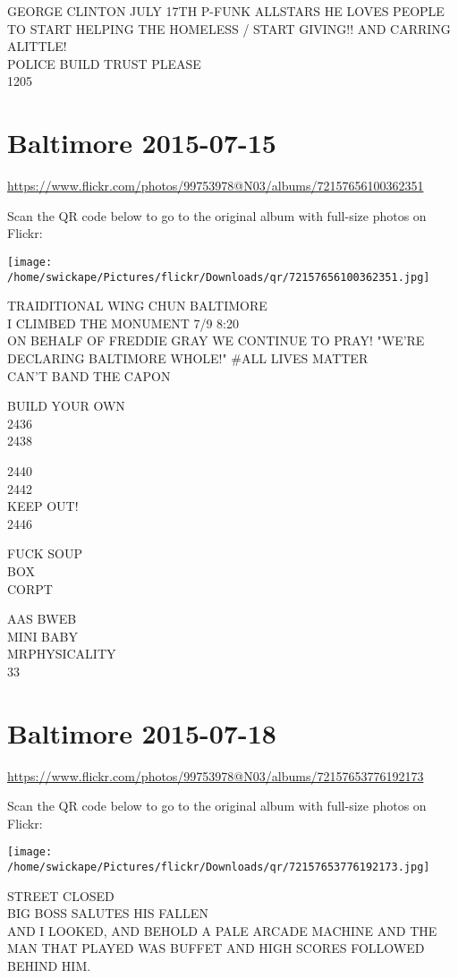 \documentclass[10pt,letterpaper]{article}
\begin{document}
GEORGE CLINTON JULY 17TH P{-}FUNK ALLSTARS HE LOVES PEOPLE TO START HELPING THE HOMELESS / START GIVING!! AND CARRING ALITTLE!\\
POLICE BUILD TRUST PLEASE\\
1205
\pagebreak

\section*{Baltimore 2015-07-15}

\url{https://www.flickr.com/photos/99753978@N03/albums/72157656100362351}

Scan the QR code below to go to the original album with full-size photos on Flickr:

\texttt{[image: /home/swickape/Pictures/flickr/Downloads/qr/72157656100362351.jpg]}
\pagebreak

TRAIDITIONAL WING CHUN BALTIMORE\\
I CLIMBED THE MONUMENT 7/9 8:20\\
ON BEHALF OF FREDDIE GRAY WE CONTINUE TO PRAY!  "WE'RE DECLARING BALTIMORE WHOLE!"  \#ALL LIVES MATTER\\
CAN'T BAND THE CAPON

BUILD YOUR OWN\\
2436\\
2438

2440\\
2442\\
KEEP OUT!\\
2446

FUCK SOUP\\
BOX\\
CORPT

AAS BWEB\\
MINI BABY\\
MRPHYSICALITY\\
33
\pagebreak

\section*{Baltimore 2015-07-18}

\url{https://www.flickr.com/photos/99753978@N03/albums/72157653776192173}

Scan the QR code below to go to the original album with full-size photos on Flickr:

\texttt{[image: /home/swickape/Pictures/flickr/Downloads/qr/72157653776192173.jpg]}
\pagebreak

STREET CLOSED\\
BIG BOSS SALUTES HIS FALLEN\\
AND I LOOKED, AND BEHOLD A PALE ARCADE MACHINE AND THE MAN THAT PLAYED WAS BUFFET AND HIGH SCORES FOLLOWED BEHIND HIM.
\end{document}
